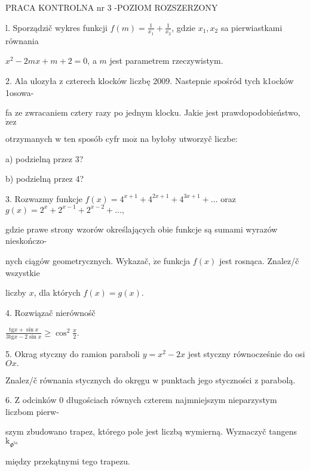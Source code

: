 \documentclass[a4paper,12pt]{article}
\begin{document}
PRACA KONTROLNA nr 3 -POZIOM ROZSZERZONY

l. Sporządzič wykres funkcji $f(m) = \displaystyle \frac{1}{x_{1}}+\frac{1}{x_{2}}$, gdzie $x_{1}, x_{2}$ sa pierwiastkami równania

$x^{2}-2mx+m+2=0$, a $m$ jest parametrem rzeczywistym.

2. Ala ulozyła $\mathrm{z}$ czterech klocków liczbę 2009. Nastepnie spośród tych k1ocków 1osowa-

fa ze zwracaniem cztery razy po jednym klocku. Jakie jest prawdopodobieństwo, $\dot{\mathrm{z}}\mathrm{e}\mathrm{z}$

otrzymanych $\mathrm{w}$ ten sposób cyfr $\mathrm{m}\mathrm{o}\dot{\mathrm{z}}$ na byłoby utworzyč liczbe:

a) podzielną przez 3?

b) podzielną przez 4?

3. Rozwazmy funkcje $ f(x)=4^{x+1}+4^{2x+1}+4^{3x+1}+\ldots$ oraz $g(x)=2^{x}+2^{x-1}+2^{x-2}+\ldots,$

gdzie prawe strony wzorów określających obie funkcje są sumami wyrazów nieskończo-

nych ciągów geometrycznych. Wykazač, $\dot{\mathrm{z}}\mathrm{e}$ funkcja $f(x)$ jest rosnąca. Znalez/č wszystkie

liczby $x$, dla których $f(x)=g(x).$

4. Rozwiązač nierównośč

$\displaystyle \frac{\mathrm{t}\mathrm{g}x+\sin x}{3\mathrm{t}\mathrm{g}x-2\sin x}\geq\cos^{2}\frac{x}{2}.$

5. Okrag styczny do ramion paraboli $y = x^{2}-2x$ jest styczny równocześnie do osi $Ox.$

Znalez/č równania stycznych do okręgu $\mathrm{w}$ punktach jego styczności $\mathrm{z}$ parabolą.

6. $\mathrm{Z}$ odcinków $0$ długościach równych czterem najmniejszym nieparzystym liczbom pierw-

szym zbudowano trapez, którego pole jest liczbą wymierną. Wyznaczyč tangens $\mathrm{k}_{\Phi^{\mathrm{t}\mathrm{a}}}$

między przekątnymi tego trapezu.
\end{document}
